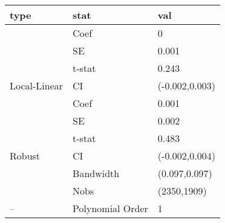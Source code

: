 
\begin{tabular}{lll}
\toprule
type & stat & val\\
\midrule
 & Coef & 0\\

 & SE & 0.001\\

 & t-stat & 0.243\\

\multirow{-4}{*}{\raggedright\arraybackslash Local-Linear} & CI & (-0.002,0.003)\\
\cmidrule{1-3}
 & Coef & 0.001\\

 & SE & 0.002\\

 & t-stat & 0.483\\

\multirow{-4}{*}{\raggedright\arraybackslash Robust} & CI & (-0.002,0.004)\\
\cmidrule{1-3}
 & Bandwidth & (0.097,0.097)\\

 & Nobs & (2350,1909)\\

\multirow{-3}{*}{\raggedright\arraybackslash --} & Polynomial Order & 1\\
\bottomrule
\end{tabular}